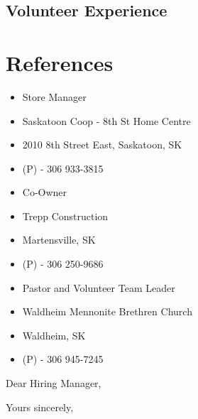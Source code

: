 \documentclass[11pt,letterpaper,sans]{moderncv}        %
\begin{document}
\subsection{Volunteer Experience}



\section{References}
{
  \begin{itemize}
    \item Store Manager
    \item Saskatoon Coop - 8th St Home Centre
    \item 2010 8th Street East, Saskatoon, SK
    \item (P) - 306 933-3815
  \end{itemize}
}

{
  \begin{itemize}
    \item Co-Owner
    \item Trepp Construction
    \item Martensville, SK
    \item (P) - 306 250-9686
  \end{itemize}
}

{
  \begin{itemize}
    \item Pastor and Volunteer Team Leader
    \item Waldheim Mennonite Brethren Church
    \item Waldheim, SK
    \item (P) - 306 945-7245
  \end{itemize}
}


\clearpage
\date{July 6, 2015}
\opening{Dear Hiring Manager,}
\closing{Yours sincerely,}
\makelettertitle
\end{document}
